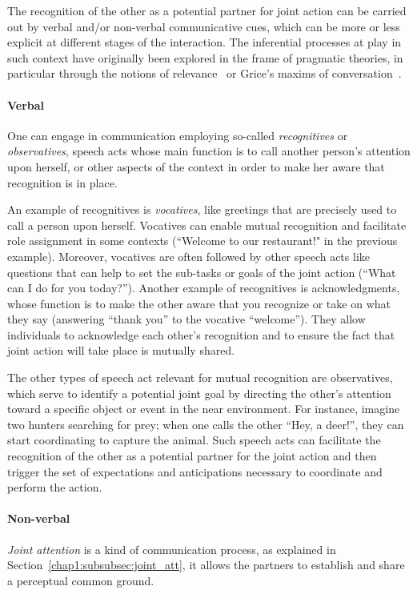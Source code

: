\documentclass[a4paper,11pt,twoside]{StyleThese}
\begin{document}
The recognition of the other as a potential partner for joint action can be carried out by verbal and/or non-verbal communicative cues, which can be more or less explicit at different stages of the interaction. The inferential processes at play in such context have originally been explored in the frame of pragmatic theories, in particular through the notions of relevance~\cite{sperber_1995_relevance} or Grice’s maxims of conversation~\cite{grice_1989_studies}.

\paragraph{Verbal} One can engage in communication employing so-called \emph{recognitives} or \emph{observatives}, speech acts whose main function is to call another person’s attention upon herself, or other aspects of the context in order to make her aware that recognition is in place. 

An example of recognitives is \emph{vocatives}, like greetings that are precisely used to call a person upon herself. Vocatives can enable mutual recognition and facilitate role assignment in some contexts (\eg ``Welcome to our restaurant!" in the previous example). Moreover, vocatives are often followed by other speech acts like questions that can help to set the sub-tasks or goals of the joint action (\eg ``What can I do for you today?''). Another example of recognitives is acknowledgments, whose function is to make the other aware that you recognize or take on what they say (\eg answering ``thank you'' to the vocative ``welcome''). They allow individuals to acknowledge each other's recognition and to ensure the fact that joint action will take place is mutually shared. 

The other types of speech act relevant for mutual recognition are observatives, which serve to identify a potential joint goal by directing the other’s attention toward a specific object or event in the near environment. For instance, imagine two hunters searching for prey; when one calls the other ``Hey, a deer!'', they can start coordinating to capture the animal. Such speech acts can facilitate the recognition of the other as a potential partner for the joint action and then trigger the set of expectations and anticipations necessary to coordinate and perform the action.

\paragraph{Non-verbal} \emph{Joint attention} is a kind of communication process, as explained in Section~\ref{chap1:subsubsec:joint_att}, it allows the partners to establish and share a perceptual common ground.
\end{document}
